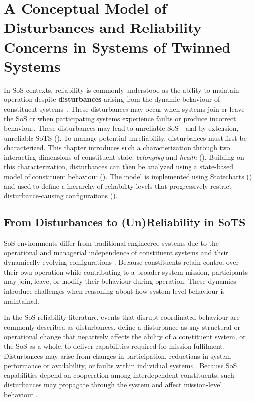 \chapter{A Conceptual Model of Disturbances and Reliability Concerns in Systems of Twinned Systems}
\label{ch:reliable-sots}
In SoS contexts, reliability is commonly understood as the ability to maintain operation despite \textbf{disturbances} arising from the dynamic behaviour of constituent systems~\cite{ferreira2023towards}. These disturbances may occur when systems join or leave the SoS or when participating systems experience faults or produce incorrect behaviour. These disturbances may lead to unreliable SoS---and by extension, unreliable SoTS (). To manage potential unreliability, disturbances must first be characterized. This chapter introduces such a characterization through two interacting dimensions of constituent state: \emph{belonging} and \emph{health} (). Building on this characterization, disturbances can then be analyzed using a state-based model of constituent behaviour (). The model is implemented using Statecharts () and used to define a hierarchy of reliability levels that progressively restrict disturbance-causing configurations ().



\section{From Disturbances to (Un)Reliability in SoTS}\label{sec:disturbances-to-unreliability}
SoS environments differ from traditional engineered systems due to the operational and managerial independence of constituent systems and their dynamically evolving configurations \cite{maier1998architecting}. Because constituents retain control over their own operation while contributing to a broader system mission, participants may join, leave, or modify their behaviour during operation. These dynamics introduce challenges when reasoning about how system-level behaviour is maintained.

In the SoS reliability literature, events that disrupt coordinated behaviour are commonly described as disturbances. \citet{ferreira2023towards} define a disturbance as any structural or operational change that negatively affects the ability of a constituent system, or the SoS as a whole, to deliver capabilities required for mission fulfilment. Disturbances may arise from changes in participation, reductions in system performance or availability, or faults within individual systems \cite{ferreira2023towards}. Because SoS capabilities depend on cooperation among interdependent constituents, such disturbances may propagate through the system and affect mission-level behaviour \cite{avizienis2004basic,li2025reliability}.

